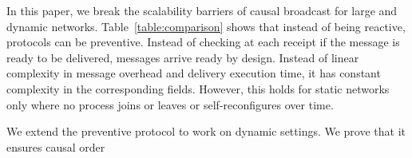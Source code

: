 In this paper, we break the scalability barriers of causal broadcast for large
and dynamic networks. Table~\ref{table:comparison} shows that instead of being
reactive, protocols can be preventive. Instead of checking at each receipt if
the message is ready to be delivered, messages arrive ready by design. %
Instead of linear complexity in message overhead and delivery execution time, it
has constant complexity in the corresponding fields. However, this holds for
static networks only where no process joins or leaves or self-reconfigures over
time. 

We extend the preventive protocol to work on dynamic settings. We prove that it
ensures causal order







